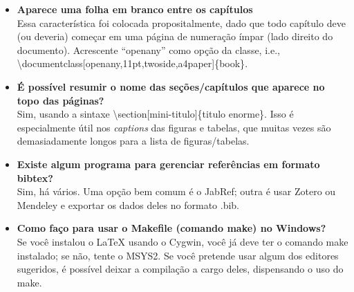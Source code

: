 \begin{itemize}
\item \textbf{Aparece uma folha em branco entre os capítulos}\\
Essa característica foi colocada propositalmente, dado que todo capítulo deve (ou deveria) começar em uma página de numeração ímpar (lado direito do documento). Acrescente ``openany'' como opção da classe, i.e., \textsf{\textbackslash{}documentclass[openany,11pt,twoside,a4paper]\{book\}}.

\item \textbf{É possível resumir o nome das seções/capítulos que aparece no topo das páginas?}\\
Sim, usando a sintaxe \textsf{\textbackslash{}section[mini-titulo]\{titulo enorme\}}. Isso é especialmente útil nos \textit{captions} das figuras e tabelas, que muitas vezes são demasiadamente longos para a lista de figuras/tabelas.

\item \textbf{Existe algum programa para gerenciar referências em formato bibtex?}\\
Sim, há vários. Uma opção bem comum é o JabRef; outra é usar Zotero ou Mendeley e exportar os dados deles no formato .bib.

\item \textbf{Como faço para usar o Makefile (comando make) no Windows?}\\
Se você instalou o \LaTeX{} usando o Cygwin, você já deve ter o comando make instalado; se não, tente o MSYS2. Se você pretende usar algum dos editores sugeridos, é possível deixar a compilação a cargo deles, dispensando o uso do make.
\end{itemize}
